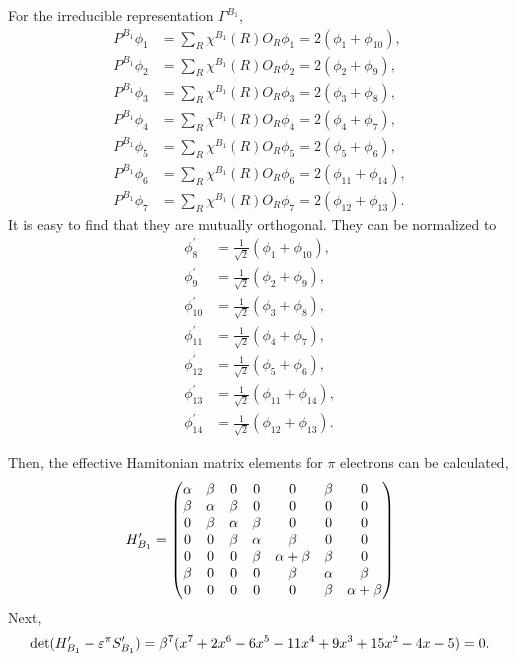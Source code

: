 		For the irreducible representation $\Gamma^{B_1}$,
		\begin{align*}
		P^{B_1}\phi_1 &= \sum_{R} \chi^{B_1}(R) O_R \phi_1 = 2(\phi_1 +\phi_{10}) , \\
		P^{B_1}\phi_2 &= \sum_{R} \chi^{B_1}(R) O_R \phi_2 = 2(\phi_2+\phi_9) ,	\\
		P^{B_1}\phi_3 &= \sum_{R} \chi^{B_1}(R) O_R \phi_3 = 2(\phi_3+\phi_8) ,	\\
		P^{B_1}\phi_4 &= \sum_{R} \chi^{B_1}(R) O_R \phi_4 = 2(\phi_4+\phi_7) ,	\\
		P^{B_1}\phi_5 &= \sum_{R} \chi^{B_1}(R) O_R \phi_5 = 2(\phi_5+\phi_6) ,	\\
		P^{B_1}\phi_6 &= \sum_{R} \chi^{B_1}(R) O_R \phi_6 = 2(\phi_{11}+\phi_{14}) ,	\\
		P^{B_1}\phi_7 &= \sum_{R} \chi^{B_1}(R) O_R \phi_7 = 2(\phi_{12}+\phi_{13}) .
		\end{align*}
		It is easy to find that they are mutually orthogonal. They can be normalized to
		\begin{align*}
		\phi^\prime_8 &= \frac{1}{\sqrt{2}} (\phi_1+\phi_{10}) , \\
		\phi^\prime_9 &= \frac{1}{\sqrt{2}} (\phi_2+\phi_9) , \\
		\phi^\prime_{10} &= \frac{1}{\sqrt{2}} (\phi_3+\phi_8) , \\
		\phi^\prime_{11} &= \frac{1}{\sqrt{2}} (\phi_4+\phi_7) , \\
		\phi^\prime_{12} &= \frac{1}{\sqrt{2}} (\phi_5+\phi_6) , \\
		\phi^\prime_{13} &= \frac{1}{\sqrt{2}} (\phi_{11}+\phi_{14}) , \\		
		\phi^\prime_{14} &= \frac{1}{\sqrt{2}} (\phi_{12}+\phi_{13}) .
		\end{align*}
		
		Then, the effective Hamitonian matrix elements for $\pi$ electrons can be calculated,
		\begin{equation*}
			H^\prime_{B_1} = \begin{pmatrix}
\alpha&\beta&	0	&	0	&		0	&	\beta 	&	0	\\
\beta&\alpha&\beta	&	0	&		0	&	0	&	0	\\
0	&\beta	&\alpha	&\beta	&		0	&	0	&	0	\\
0	&	0	&\beta	&\alpha	&	\beta	&	0	&	0	\\
0	&	0	&	0	&\beta	&\alpha+\beta&	\beta	&	0\\
\beta&	0	&	0	&	0	& \beta		&	\alpha	&	\beta \\
0	&	0	&	0	&	0	&	0		&	\beta	&\alpha+\beta\\
			\end{pmatrix}					
		\end{equation*}
		Next,
		\begin{align*}
			\det(H^\prime_{B_1}-\varepsilon^\pi S^\prime_{B_1}) = \beta^7 ( x^7 + 2x^6 - 6x^5 - 11x^4 + 9x^3 +15x^2 -4x -5 ) = 0.
		\end{align*}
		
